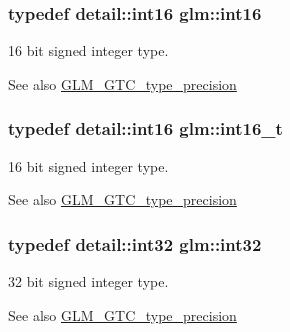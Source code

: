 \subsubsection[{\texorpdfstring{int16}{int16}}]{\setlength{\rightskip}{0pt plus 5cm}typedef detail\+::int16 {\bf glm\+::int16}}\hypertarget{group__gtc__type__precision_ga2945a61d12771f8954994fcddf02b021}{}\label{group__gtc__type__precision_ga2945a61d12771f8954994fcddf02b021}
16 bit signed integer type. \begin{DoxySeeAlso}{See also}
\hyperlink{group__gtc__type__precision}{G\+L\+M\+\_\+\+G\+T\+C\+\_\+type\+\_\+precision} 
\end{DoxySeeAlso}
\subsubsection[{\texorpdfstring{int16\+\_\+t}{int16_t}}]{\setlength{\rightskip}{0pt plus 5cm}typedef detail\+::int16 {\bf glm\+::int16\+\_\+t}}\hypertarget{group__gtc__type__precision_gaf89ee61e0d34aa4a462104b7ae7f2da6}{}\label{group__gtc__type__precision_gaf89ee61e0d34aa4a462104b7ae7f2da6}
16 bit signed integer type. \begin{DoxySeeAlso}{See also}
\hyperlink{group__gtc__type__precision}{G\+L\+M\+\_\+\+G\+T\+C\+\_\+type\+\_\+precision} 
\end{DoxySeeAlso}
\subsubsection[{\texorpdfstring{int32}{int32}}]{\setlength{\rightskip}{0pt plus 5cm}typedef detail\+::int32 {\bf glm\+::int32}}\hypertarget{group__gtc__type__precision_ga632d8b25f6b61659f39ea4321fab92a4}{}\label{group__gtc__type__precision_ga632d8b25f6b61659f39ea4321fab92a4}
32 bit signed integer type. \begin{DoxySeeAlso}{See also}
\hyperlink{group__gtc__type__precision}{G\+L\+M\+\_\+\+G\+T\+C\+\_\+type\+\_\+precision} 
\end{DoxySeeAlso}
